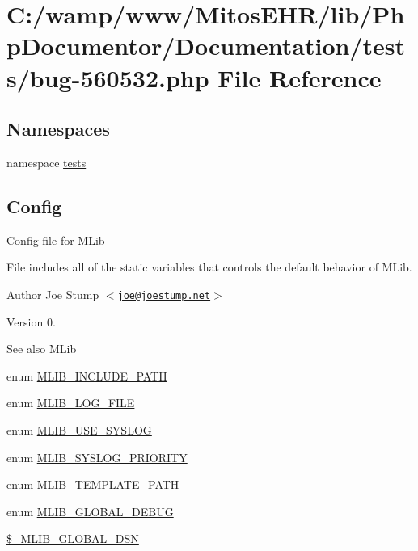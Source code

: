\hypertarget{bug-560532_8php}{\section{\-C\-:/wamp/www/\-Mitos\-E\-H\-R/lib/\-Php\-Documentor/\-Documentation/tests/bug-\/560532.php \-File \-Reference}
\label{bug-560532_8php}
}
\subsection*{\-Namespaces}
\begin{DoxyCompactItemize}
\item 
namespace \hyperlink{namespacetests}{tests}
\end{DoxyCompactItemize}
\subsection*{\-Config}
\label{_amgrpfa535ffb25e1fd20341652f9be21e06e}%
 \-Config file for \-M\-Lib

\-File includes all of the static variables that controls the default behavior of \-M\-Lib.

\begin{DoxyAuthor}{\-Author}
\-Joe \-Stump $<$\href{mailto:joe@joestump.net}{\tt joe@joestump.\-net}$>$ 
\end{DoxyAuthor}
\begin{DoxyVersion}{\-Version}
0. 
\end{DoxyVersion}
\begin{DoxySeeAlso}{\-See also}
\-M\-Lib 
\end{DoxySeeAlso}
\begin{DoxyCompactItemize}
\item 
enum \hyperlink{bug-560532_8php_a1a2325154c8188acb8b9570d7b4d45de}{\-M\-L\-I\-B\-\_\-\-I\-N\-C\-L\-U\-D\-E\-\_\-\-P\-A\-T\-H} 
\item 
enum \hyperlink{bug-560532_8php_ae6ff542323c614333b346e035a1700c7}{\-M\-L\-I\-B\-\_\-\-L\-O\-G\-\_\-\-F\-I\-L\-E} 
\item 
enum \hyperlink{bug-560532_8php_a02a03d86327e82cba1f4db2402f6dc30}{\-M\-L\-I\-B\-\_\-\-U\-S\-E\-\_\-\-S\-Y\-S\-L\-O\-G} 
\item 
enum \hyperlink{bug-560532_8php_a9e03617702faed4e255489358b73794a}{\-M\-L\-I\-B\-\_\-\-S\-Y\-S\-L\-O\-G\-\_\-\-P\-R\-I\-O\-R\-I\-T\-Y} 
\item 
enum \hyperlink{bug-560532_8php_a5788ff5311b6c1f774823861a02633fb}{\-M\-L\-I\-B\-\_\-\-T\-E\-M\-P\-L\-A\-T\-E\-\_\-\-P\-A\-T\-H} 
\item 
enum \hyperlink{bug-560532_8php_a06805e0feca1483374f6e4ff790428de}{\-M\-L\-I\-B\-\_\-\-G\-L\-O\-B\-A\-L\-\_\-\-D\-E\-B\-U\-G} 
\item 
\hyperlink{bug-560532_8php_a30d6055aa7b520c871c09eca9bbb1b52}{\$\-\_\-\-M\-L\-I\-B\-\_\-\-G\-L\-O\-B\-A\-L\-\_\-\-D\-S\-N}
\end{DoxyCompactItemize}


